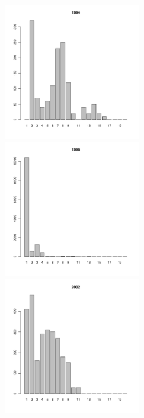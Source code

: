 \begin{figure}[h]
\begin{multicols}{3}
\hfill
\includegraphics[width=60mm]{../White_Sea/Luvenga_Goreliy/middle_1994_.pdf}
\hfill
\includegraphics[width=60mm]{../White_Sea/Luvenga_Goreliy/middle_1998_.pdf}
\hfill
\includegraphics[width=60mm]{../White_Sea/Luvenga_Goreliy/middle_2002_.pdf}
\end{multicols}



\end{figure}
